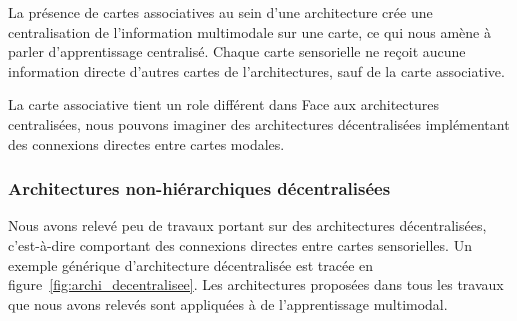 \documentclass[../main]{subfiles}
\begin{document}
La présence de cartes associatives au sein d'une architecture crée une centralisation de l'information multimodale sur une carte, ce qui nous amène à parler d'apprentissage centralisé. Chaque carte sensorielle ne reçoit aucune information directe d'autres cartes de l'architectures, sauf de la carte associative.

La carte associative tient un role différent dans 
Face aux architectures centralisées, nous pouvons imaginer des architectures décentralisées implémentant des connexions directes entre cartes modales.

\subsubsection{Architectures non-hiérarchiques décentralisées}

Nous avons relevé peu de travaux portant sur des architectures décentralisées, c'est-à-dire comportant des connexions directes entre cartes sensorielles. Un exemple générique d'architecture décentralisée est tracée en figure~\ref{fig:archi_decentralisee}. Les architectures proposées dans tous les travaux que nous avons relevés sont appliquées à de l'apprentissage multimodal.

\end{document}
